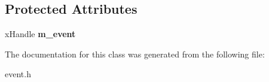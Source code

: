 \subsection*{Protected Attributes}
\begin{DoxyCompactItemize}
\item 
\hypertarget{class_c_event_bit_a99560a5eb8518d37c62dd30d3382c17e}{x\-Handle {\bfseries m\-\_\-event}}\label{class_c_event_bit_a99560a5eb8518d37c62dd30d3382c17e}

\end{DoxyCompactItemize}


The documentation for this class was generated from the following file\-:\begin{DoxyCompactItemize}
\item 
event.\-h\end{DoxyCompactItemize}
